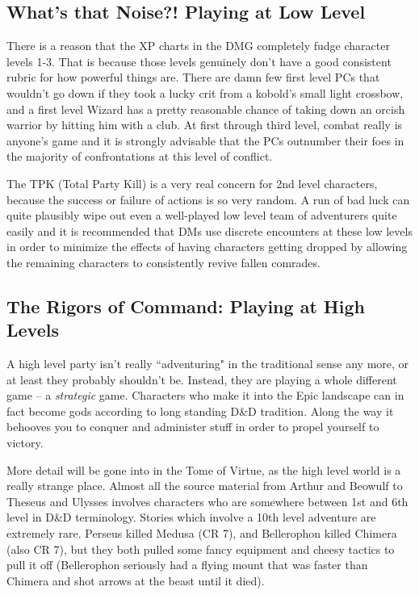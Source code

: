 \subsection{What's that Noise?! Playing at Low Level}

There is a reason that the XP charts in the DMG completely fudge character levels 1-3. That is because those levels genuinely don't have a good consistent rubric for how powerful things are. There are damn few first level PCs that wouldn't go down if they took a lucky crit from a kobold's small light crossbow, and a first level Wizard has a pretty reasonable chance of taking down an orcish warrior by hitting him with a club. At first through third level, combat really is anyone's game and it is strongly advisable that the PCs outnumber their foes in the majority of confrontations at this level of conflict.

The TPK (Total Party Kill) is a very real concern for 2nd level characters, because the success or failure of actions is so very random. A run of bad luck can quite plausibly wipe out even a well-played low level team of adventurers quite easily and it is recommended that DMs use discrete encounters at these low levels in order to minimize the effects of having characters getting dropped by allowing the remaining characters to consistently revive fallen comrades.

\subsection{The Rigors of Command: Playing at High Levels}

A high level party isn't really ``adventuring" in the traditional sense any more, or at least they probably shouldn't be. Instead, they are playing a whole different game -- a \textit{strategic} game. Characters who make it into the Epic landscape can in fact become gods according to long standing D\&D tradition. Along the way it behooves you to conquer and administer stuff in order to propel yourself to victory.

More detail will be gone into in the Tome of Virtue, as the high level world is a really strange place. Almost all the source material from Arthur and Beowulf to Theseus and Ulysses involves characters who are somewhere between 1st and 6th level in D\&D terminology. Stories which involve a 10th level adventure are extremely rare. Perseus killed Medusa (CR 7), and Bellerophon killed Chimera (also CR 7), but they both pulled some fancy equipment and cheesy tactics to pull it off (Bellerophon seriously had a flying mount that was faster than Chimera and shot arrows at the beast until it died).

